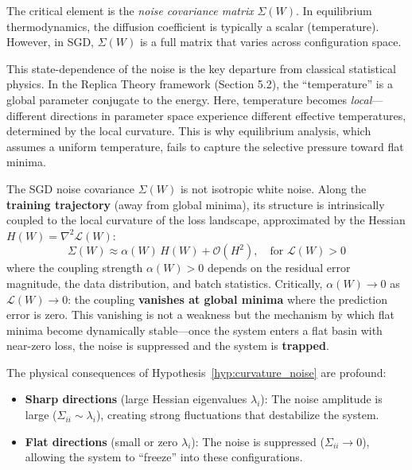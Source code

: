 \documentclass[
  journal=largetwo,
  year=2025,
  volume=37,
]{cup-journal}
\begin{document}
The critical element is the \textit{noise covariance matrix} $\Sigma(W)$. In equilibrium thermodynamics, the diffusion coefficient is typically a scalar (temperature). However, in SGD, $\Sigma(W)$ is a full matrix that varies across configuration space.

This state-dependence of the noise is the key departure from classical statistical physics. In the Replica Theory framework (Section 5.2), the ``temperature'' is a global parameter conjugate to the energy. Here, temperature becomes \textit{local}---different directions in parameter space experience different effective temperatures, determined by the local curvature. This is why equilibrium analysis, which assumes a uniform temperature, fails to capture the selective pressure toward flat minima.

\begin{hypothesis}\label{hyp:curvature_noise}
The SGD noise covariance $\Sigma(W)$ is not isotropic white noise. Along the \textbf{training trajectory} (away from global minima), its structure is intrinsically coupled to the local curvature of the loss landscape, approximated by the Hessian $H(W) = \nabla^2 \mathcal{L}(W)$:
\begin{equation}\label{eq:noise_hessian_coupling}
    \Sigma(W) \approx \alpha(W) \, H(W) + \mathcal{O}(H^2), \quad \text{for } \mathcal{L}(W) > 0
\end{equation}
where the coupling strength $\alpha(W) > 0$ depends on the residual error magnitude, the data distribution, and batch statistics. Critically, $\alpha(W) \to 0$ as $\mathcal{L}(W) \to 0$: the coupling \textbf{vanishes at global minima} where the prediction error is zero. This vanishing is not a weakness but the mechanism by which flat minima become dynamically stable---once the system enters a flat basin with near-zero loss, the noise is suppressed and the system is \textbf{trapped}.
\end{hypothesis}



The physical consequences of Hypothesis~\ref{hyp:curvature_noise} are profound:

\begin{itemize}
    \item \textbf{Sharp directions} (large Hessian eigenvalues $\lambda_i$): The noise amplitude is large ($\Sigma_{ii} \sim \lambda_i$), creating strong fluctuations that destabilize the system.
    \item \textbf{Flat directions} (small or zero $\lambda_i$): The noise is suppressed ($\Sigma_{ii} \to 0$), allowing the system to ``freeze'' into these configurations.
\end{itemize}
\end{document}
